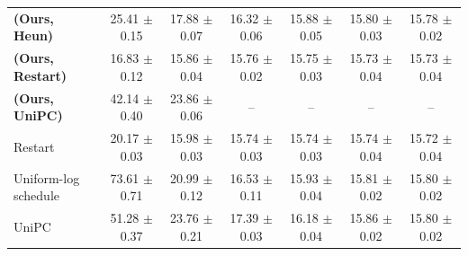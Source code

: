 \begin{tabular}{lcccccc}
\textbf{(Ours, Heun)} & 25.41 {\scriptsize $\pm$ 0.15} & 17.88 {\scriptsize $\pm$ 0.07} & 16.32 {\scriptsize $\pm$ 0.06} & 15.88 {\scriptsize $\pm$ 0.05} & 15.80 {\scriptsize $\pm$ 0.03} & 15.78 {\scriptsize $\pm$ 0.02} \\
\textbf{(Ours, Restart)} & 16.83 {\scriptsize $\pm$ 0.12} & 15.86 {\scriptsize $\pm$ 0.04} & 15.76 {\scriptsize $\pm$ 0.02} & 15.75 {\scriptsize $\pm$ 0.03} & 15.73 {\scriptsize $\pm$ 0.04} & 15.73 {\scriptsize $\pm$ 0.04} \\
\textbf{(Ours, UniPC)} & 42.14 {\scriptsize $\pm$ 0.40} & 23.86 {\scriptsize $\pm$ 0.06} & -- & -- & -- & -- \\
Restart & 20.17 {\scriptsize $\pm$ 0.03} & 15.98 {\scriptsize $\pm$ 0.03} & 15.74 {\scriptsize $\pm$ 0.03} & 15.74 {\scriptsize $\pm$ 0.03} & 15.74 {\scriptsize $\pm$ 0.04} & 15.72 {\scriptsize $\pm$ 0.04} \\
Uniform-log schedule & 73.61 {\scriptsize $\pm$ 0.71} & 20.99 {\scriptsize $\pm$ 0.12} & 16.53 {\scriptsize $\pm$ 0.11} & 15.93 {\scriptsize $\pm$ 0.04} & 15.81 {\scriptsize $\pm$ 0.02} & 15.80 {\scriptsize $\pm$ 0.02} \\
UniPC & 51.28 {\scriptsize $\pm$ 0.37} & 23.76 {\scriptsize $\pm$ 0.21} & 17.39 {\scriptsize $\pm$ 0.03} & 16.18 {\scriptsize $\pm$ 0.04} & 15.86 {\scriptsize $\pm$ 0.02} & 15.80 {\scriptsize $\pm$ 0.02} \\
\bottomrule
\end{tabular}